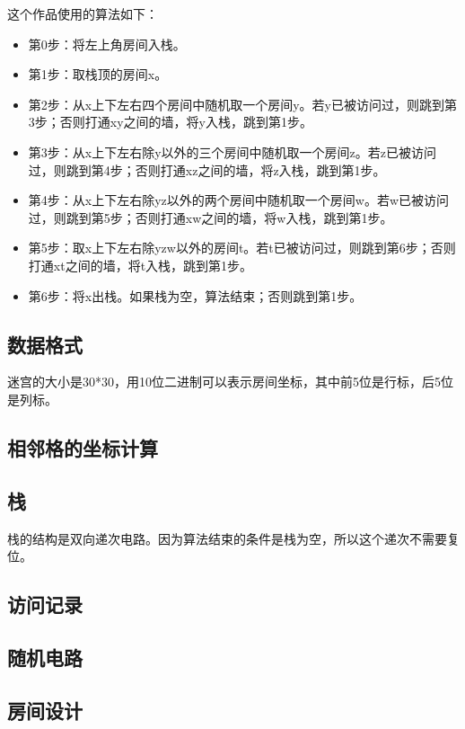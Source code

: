 这个作品使用的算法如下：
\begin{itemize}
	\item 第0步：将左上角房间入栈。
	\item 第1步：取栈顶的房间x。
	\item 第2步：从x上下左右四个房间中随机取一个房间y。若y已被访问过，则跳到第3步；否则打通xy之间的墙，将y入栈，跳到第1步。
	\item 第3步：从x上下左右除y以外的三个房间中随机取一个房间z。若z已被访问过，则跳到第4步；否则打通xz之间的墙，将z入栈，跳到第1步。
	\item 第4步：从x上下左右除yz以外的两个房间中随机取一个房间w。若w已被访问过，则跳到第5步；否则打通xw之间的墙，将w入栈，跳到第1步。
	\item 第5步：取x上下左右除yzw以外的房间t。若t已被访问过，则跳到第6步；否则打通xt之间的墙，将t入栈，跳到第1步。
	\item 第6步：将x出栈。如果栈为空，算法结束；否则跳到第1步。
\end{itemize}

\subsection{数据格式}
迷宫的大小是30*30，用10位二进制可以表示房间坐标，其中前5位是行标，后5位是列标。

\subsection{相邻格的坐标计算}

\subsection{栈}
栈的结构是双向递次电路。因为算法结束的条件是栈为空，所以这个递次不需要复位。

\subsection{访问记录}

\subsection{随机电路}

\subsection{房间设计}